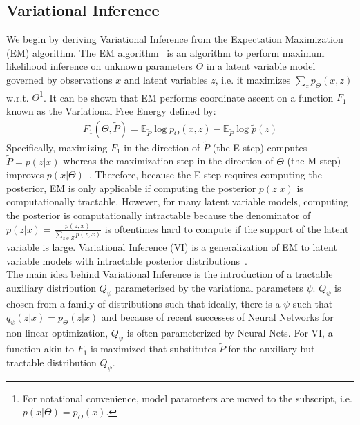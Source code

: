 
\subsection{Variational Inference}
\label{sec:format}
We begin by deriving Variational Inference from the Expectation Maximization (EM) algorithm. The EM algorithm~\cite{dempster1977maximum} is an algorithm to perform maximum likelihood inference on unknown parameters $\Theta$ in a latent variable model governed by observations $x$ and latent variables $z$, i.e. it maximizes $\sum_z p_\Theta(x,z)$ w.r.t. $\Theta$\footnote{For notational convenience, model parameters are moved to the subscript, i.e. $p(x|\Theta) = p_\Theta(x)$.}. It can be shown that EM performs coordinate ascent on a function $F_1$ known as the Variational Free Energy defined by:
\begin{align*}
F_{1}(\Theta, \tilde{P}) = \mathbb{E}_{\tilde{P}} \log p_\Theta(x,z) - \mathbb{E}_{\tilde{P}} \log \tilde{p}(z)
\end{align*} Specifically, maximizing $F_1$ in the direction of $\tilde{P}$ (the E-step) computes $\tilde{P} = p(z|x)$ whereas the maximization step in the direction of $\Theta$ (the M-step) improves $p(x|\Theta)$~\cite{neal1998view}. Therefore, because the E-step requires computing the posterior, EM is only applicable if computing the posterior $p(z|x)$ is computationally tractable. However, for many latent variable models, computing the posterior is computationally intractable because the denominator of $p(z|x)=\frac{p(z,x)}{\sum_{z\in Z} p(z,x)}$ is oftentimes hard to compute if the support of the latent variable is large. Variational Inference (VI) is a generalization of EM to latent variable models with intractable posterior distributions~\cite{jordan1999introduction}.\\
The main idea behind Variational Inference is the introduction of a tractable auxiliary distribution $Q_\psi$ parameterized by the variational parameters $\psi$. $Q_\psi$ is chosen from a family of distributions such that ideally, there is a $\psi$ such that $q_\psi(z|x) = p_\Theta(z|x)$ and because of recent successes of Neural Networks for non-linear optimization, $Q_\psi$ is often parameterized by Neural Nets. For VI, a function akin to $F_1$ is maximized that substitutes $\tilde{P}$ for the auxiliary but tractable distribution $Q_\psi$.
